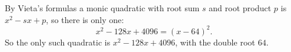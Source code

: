 By Vieta's formulas a monic quadratic with root sum $s$ and root product $p$ is $x^2-sx+p$, so there is only one:
\[x^2-128x+4096=(x-64)^2.\]
So the only such quadratic is $\boxed{x^2-128x+4096}$, with the double root $64$.
